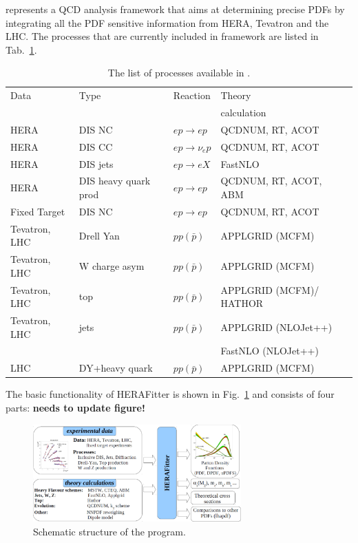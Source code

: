 \fitter represents a QCD analysis framework that aims at 
determining precise PDFs by integrating all the PDF sensitive information
from HERA, Tevatron and the LHC.
%
The processes that are currently included in \fitter framework are listed in Tab.~\ref{tab:proc}.
%
\begin{table}
\small
\tiny

\begin{tabular}{|l|l|l|l|}
\hline
Data &Type &  Reaction & Theory      \\
        &     &     & calculation \\
\hline

HERA &DIS NC   &$ep\to ep$ & QCDNUM, RT, ACOT \\
HERA &DIS CC   &$ep\to \nu_e p$ & QCDNUM, RT, ACOT\\
HERA &DIS jets &$ep\to eX$ & FastNLO\\
HERA &DIS heavy quark prod & $ep\to ep $& QCDNUM, RT, ACOT, ABM \\
\hline
Fixed Target &DIS NC   &$ep\to ep$ & QCDNUM, RT, ACOT \\
\hline
Tevatron, LHC &Drell Yan &$pp(\bar p)$ & APPLGRID (MCFM) \\
Tevatron, LHC &W charge asym &$pp(\bar p)$ & APPLGRID (MCFM) \\
Tevatron, LHC &top &$pp(\bar p)$ & APPLGRID (MCFM)/ HATHOR \\
Tevatron, LHC &jets &$pp(\bar p)$ & APPLGRID (NLOJet++) \\
                &  & & FastNLO (NLOJet++) \\
LHC&  DY+heavy quark &$pp(\bar p)$ & APPLGRID (MCFM) \\
\hline
\end{tabular}
\caption{The list of processes available in \fitter.}
\label{tab:proc}
\end{table}
%
\normalsize
The basic functionality of HERAFitter is shown in Fig.~\ref{fig:flow} and consists of four parts: {\bf needs to update figure!}
\begin{figure}[!ht]
   \centering
   \includegraphics[width=8cm]{flow.pdf}
   \caption{Schematic structure of the \fitter program.} 
 \label{fig:flow}
\end{figure}
